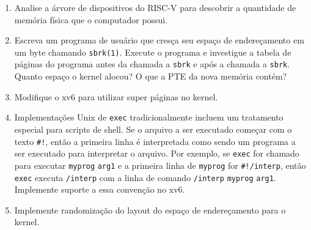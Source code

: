 \begin{enumerate}
  
\item Analise a árvore de dispositivos do RISC-V para descobrir a quantidade de memória física que o computador possui.

\item Escreva um programa de usuário que cresça seu espaço de endereçamento em um byte chamando \lstinline{sbrk(1)}.
Execute o programa e investigue a tabela de páginas do programa antes da chamada a \lstinline{sbrk} e após a chamada a \lstinline{sbrk}.
Quanto espaço o kernel alocou? O que a PTE da nova memória contém?

\item Modifique o xv6 para utilizar super páginas no kernel.

\item Implementações Unix de \lstinline{exec} tradicionalmente incluem um tratamento especial para scripts de shell. Se o arquivo a ser executado começar com o texto \lstinline{#!}, então a 
primeira linha é interpretada como sendo um programa a ser executado para interpretar o arquivo. Por exemplo, se \lstinline{exec} for chamado para executar \lstinline{myprog} \lstinline{arg1} e a 
primeira linha de \lstinline{myprog} for \lstinline{#!/interp}, então \lstinline{exec} executa \lstinline{/interp} com a linha de comando \lstinline{/interp} \lstinline{myprog} \lstinline{arg1}. 
Implemente suporte a essa convenção no xv6.

\item Implemente randomização do layout do espaço de endereçamento para o kernel.

\end{enumerate}
